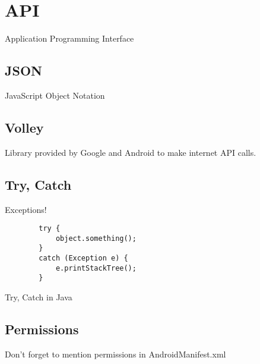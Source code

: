 \chapter{API}
Application Programming Interface

\section{JSON}
JavaScript Object Notation

\section{Volley}
Library provided by Google and Android to make internet API calls.

\section{Try, Catch}
Exceptions!
\begin{code}
	\begin{verbatim}
		try {
			object.something();
		}
		catch (Exception e) {
			e.printStackTree();
		}
	\end{verbatim}
	\caption{Try, Catch in Java}
\end{code}

\section{Permissions}
Don't forget to mention permissions in AndroidManifest.xml